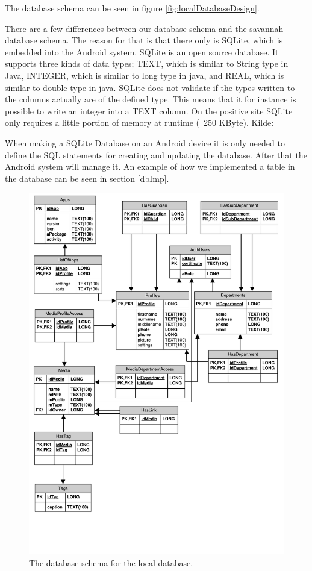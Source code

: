 The database schema can be seen in figure \autoref{fig:localDatabaseDesign}.


There are a few differences between our database schema and the savannah database schema. The reason for that is that there only is SQLite, which is embedded into the Android system. SQLite is an open source database. It supports three kinds of data types; TEXT, which is similar to String type in Java, INTEGER, which is similar to long type in java, and REAL, which is similar to double type in java. SQLite does not validate if the types written to the columns actually are of the defined type. This means that it for instance is possible to write an integer into a TEXT column. On the positive site SQLite only requires a little portion of memory at runtime (~250 KByte). Kilde:

When making a SQLite Database on an Android device it is only needed to define the SQL statements for creating and updating the database. After that the Android system will manage it. An example of how we implemented a table in the database can be seen in section \vref{dbImp}.

\begin{figure}[htbp]
	\centering
		\includegraphics[width=\textwidth]{Images/LocalDatabaseDesign}
	\caption{The database schema for the local database.}
	\label{fig:localDatabaseDesign}
\end{figure}


